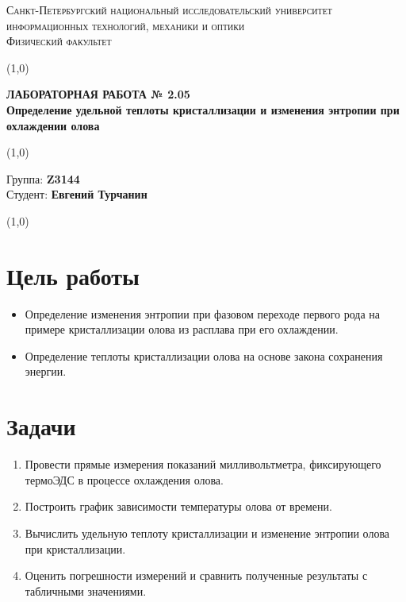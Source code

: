 \documentclass[a4paper]{article}
\date{} %
\begin{document}
\begin{center}
\textsc{Санкт-Петербургский национальный исследовательский университет информационных технологий, механики и оптики\\[3mm] %
Физический факультет}
\end{center}
\vspace{5mm}
\line(1,0){\textwidth}
\begin{center}
\textbf{ЛАБОРАТОРНАЯ РАБОТА № 2.05}\\[2mm] %
\textbf{Определение удельной теплоты кристаллизации и изменения энтропии при охлаждении олова} %
\end{center}
\vspace{2mm}
\line(1,0){\textwidth}
\vspace{5mm}
\begin{minipage}{0.4\textwidth}
    Группа: \textbf{Z3144} \\ %
    Студент: \textbf{Евгений Турчанин}\\ %
    \vspace{1mm}
\end{minipage}
\hfill %
\vspace{1mm}
\line(1,0){\textwidth}

\section{\textbf{Цель работы}}

\begin{itemize}
    \item Определение изменения энтропии при фазовом переходе первого рода на примере кристаллизации олова из расплава при его охлаждении.
    \item Определение теплоты кристаллизации олова на основе закона сохранения энергии.
\end{itemize}

\section{\textbf{Задачи}}

\begin{enumerate}
    \item Провести прямые измерения показаний милливольтметра, фиксирующего термоЭДС в процессе охлаждения олова.
    \item Построить график зависимости температуры олова от времени.
    \item Вычислить удельную теплоту кристаллизации и изменение энтропии олова при кристаллизации.
    \item Оценить погрешности измерений и сравнить полученные результаты с табличными значениями.
\end{enumerate}
\end{document}
